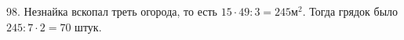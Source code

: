 98. Незнайка вскопал треть огорода, то есть $15\cdot49:3=245\text{м}^2.$ Тогда грядок было $245:7\cdot2=70$ штук.\\
